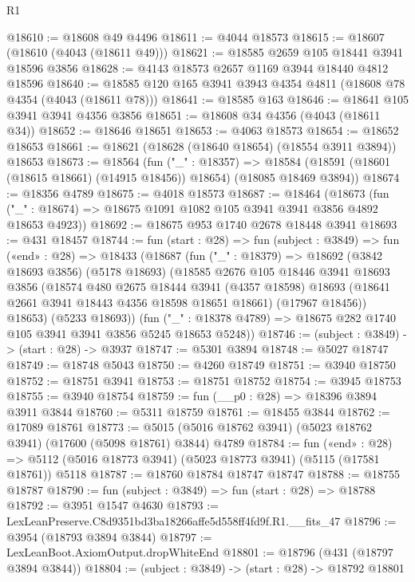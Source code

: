 \begin{lexlean}{R1}
\begin{coremodule}
@18610 := @18608 @49 @4496
@18611 := @4044 @18573
@18615 := @18607 (@18610 (@4043 (@18611 @49)))
@18621 := @18585 @2659 @105 @18441 @3941 @18596 @3856
@18628 := @4143 @18573 @2657 @1169 @3944 @18440 @4812 @18596
@18640 := @18585 @120 @165 @3941 @3943 @4354 @4811 (@18608 @78 @4354 (@4043 (@18611 @78)))
@18641 := @18585 @163
@18646 := @18641 @105 @3941 @3941 @4356 @3856
@18651 := @18608 @34 @4356 (@4043 (@18611 @34))
@18652 := @18646 @18651
@18653 := @4063 @18573
@18654 := @18652 @18653
@18661 := @18621 (@18628 (@18640 @18654) (@18554 @3911 @3894)) @18653
@18673 := @18564
    (fun ("_" : @18357) =>
    @18584 (@18591 (@18601 (@18615 @18661) (@14915 @18456)) @18654) (@18085 @18469 @3894))
@18674 := @18356 @4789
@18675 := @4018 @18573
@18687 := @18464
    (@18673 (fun ("_" : @18674) => @18675 @1091 @1082 @105 @3941 @3941 @3856 @4892 @18653 @4923))
@18692 := @18675 @953 @1740 @2678 @18448 @3941
@18693 := @431 @18457
@18744 := fun (start : @28) =>
  fun (subject : @3849) =>
  fun («end» : @28) =>
  @18433
    (@18687
      (fun ("_" : @18379) =>
      @18692
        (@3842 @18693 @3856)
        (@5178 @18693)
        (@18585
          @2676
          @105
          @18446
          @3941
          @18693
          @3856
          (@18574
            @480
            @2675
            @18444
            @3941
            (@4357 @18598)
            @18693
            (@18641 @2661 @3941 @18443 @4356 @18598 @18651 @18661)
            (@17967 @18456))
          @18653)
        (@5233 @18693))
      (fun ("_" : @18378 @4789) => @18675 @282 @1740 @105 @3941 @3941 @3856 @5245 @18653 @5248))
@18746 := (subject : @3849) -> (start : @28) -> @3937
@18747 := @5301 @3894
@18748 := @5027 @18747
@18749 := @18748 @5043
@18750 := @4260 @18749
@18751 := @3940 @18750
@18752 := @18751 @3941
@18753 := @18751 @18752
@18754 := @3945 @18753
@18755 := @3940 @18754
@18759 := fun (__p0 : @28) => @18396 @3894 @3911 @3844
@18760 := @5311 @18759
@18761 := @18455 @3844
@18762 := @17089 @18761
@18773 := @5015 (@5016 @18762 @3941) (@5023 @18762 @3941) (@17600 (@5098 @18761) @3844) @4789
@18784 := fun («end» : @28) =>
  @5112 (@5016 @18773 @3941) (@5023 @18773 @3941) (@5115 (@17581 @18761)) @5118
@18787 := @18760 @18784 @18747 @18747
@18788 := @18755 @18787
@18790 := fun (subject : @3849) => fun (start : @28) => @18788
@18792 := @3951 @1547 @4630
@18793 := LexLeanPreserve.C8d9351bd3ba18266affe5d558ff4fd9f.R1.__fits_47
@18796 := @3954 (@18793 @3894 @3844)
@18797 := LexLeanBoot.AxiomOutput.dropWhiteEnd
@18801 := @18796 (@431 (@18797 @3894 @3844))
@18804 := (subject : @3849) -> (start : @28) -> @18792 @18801

\end{coremodule}
\end{lexlean}
